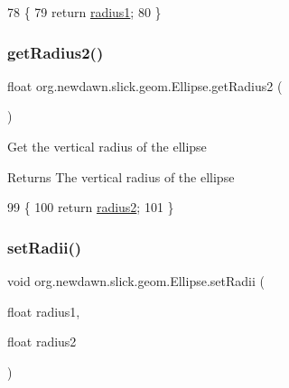 \begin{DoxyCode}
78                               \{
79         \textcolor{keywordflow}{return} \mbox{\hyperlink{classorg_1_1newdawn_1_1slick_1_1geom_1_1_ellipse_a26f6d13c3b22a475bc1caf33f84a24b9}{radius1}};
80     \}
\end{DoxyCode}
\mbox{\label{classorg_1_1newdawn_1_1slick_1_1geom_1_1_ellipse_afad8a29eff0ab082da1c01da7228464a}} 
\subsubsection{\texorpdfstring{get\+Radius2()}{getRadius2()}}
{\footnotesize\ttfamily float org.\+newdawn.\+slick.\+geom.\+Ellipse.\+get\+Radius2 (\begin{DoxyParamCaption}{ }\end{DoxyParamCaption})\hspace{0.3cm}{\ttfamily [inline]}}

Get the vertical radius of the ellipse

\begin{DoxyReturn}{Returns}
The vertical radius of the ellipse 
\end{DoxyReturn}

\begin{DoxyCode}
99                               \{
100         \textcolor{keywordflow}{return} \mbox{\hyperlink{classorg_1_1newdawn_1_1slick_1_1geom_1_1_ellipse_ad3152cb17acd020ac3ae7bf70526ae9f}{radius2}};
101     \}
\end{DoxyCode}
\mbox{\label{classorg_1_1newdawn_1_1slick_1_1geom_1_1_ellipse_a3cf63c73d9aa79988a4f2d68cf2611c1}} 
\subsubsection{\texorpdfstring{set\+Radii()}{setRadii()}}
{\footnotesize\ttfamily void org.\+newdawn.\+slick.\+geom.\+Ellipse.\+set\+Radii (\begin{DoxyParamCaption}\item[{float}]{radius1,  }\item[{float}]{radius2 }\end{DoxyParamCaption})\hspace{0.3cm}{\ttfamily [inline]}}

